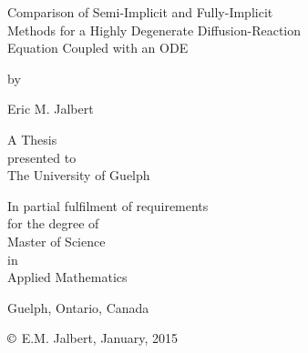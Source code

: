\begin{titlepage}
  \begin{center}
    \vspace*{4cm}
    \LARGE{Comparison of Semi-Implicit and Fully-Implicit \\Methods for a Highly Degenerate Diffusion-Reaction \\Equation Coupled with an ODE}
    \vspace*{0.5cm}
    
    \small{by}
    \vspace*{0.5cm}
    
    \large{Eric M. Jalbert}
    \vspace*{3.5cm}
    
    A Thesis\\presented to\\The University of Guelph
    \vspace*{1.5cm}
    
    In partial fulfilment of requirements\\for the degree of\\Master of Science\\in\\Applied Mathematics
    \vfill

    Guelph, Ontario, Canada
    
    $\copyright$ E.M. Jalbert, January, 2015
  \end{center}
\end{titlepage}





